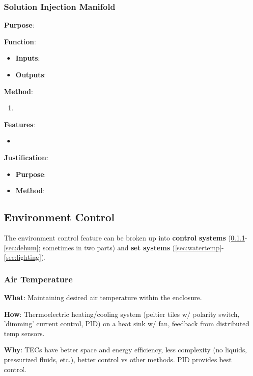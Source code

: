 \documentclass{report}
\begin{document}
\newpage

\subsubsection{Solution Injection Manifold}
\label{sec:manifold}

\textbf{Purpose}:

\textbf{Function}:
\begin{itemize}
    \item \textbf{Inputs}:
    \item \textbf{Outputs}:
\end{itemize}

\textbf{Method}:
\begin{enumerate}
    \item 
\end{enumerate}

\textbf{Features}:
\begin{itemize}
    \item 
\end{itemize}

\textbf{Justification}:
\begin{itemize}
    \item \textbf{Purpose}:
    \item \textbf{Method}:
\end{itemize}

\subsection{Environment Control}
\label{sec:environment}

The environment control feature can be broken up into \textbf{control systems} (\ref{sec:airtemp}-\ref{sec:dehum}; sometimes in two parts) and \textbf{set systems} (\ref{sec:watertemp}-\ref{sec:lighting}).

\subsubsection{Air Temperature}
\label{sec:airtemp}

\textbf{What}: Maintaining desired air temperature within the enclosure.

\textbf{How}: Thermoelectric heating/cooling system (peltier tiles w/ polarity switch, 'dimming' current control, PID) on a heat sink w/ fan, feedback from distributed temp sensors.

\textbf{Why}: TECs have better space and energy efficiency, less complexity (no liquids, pressurized fluids, etc.), better control vs other methods. PID provides best control.
\end{document}
